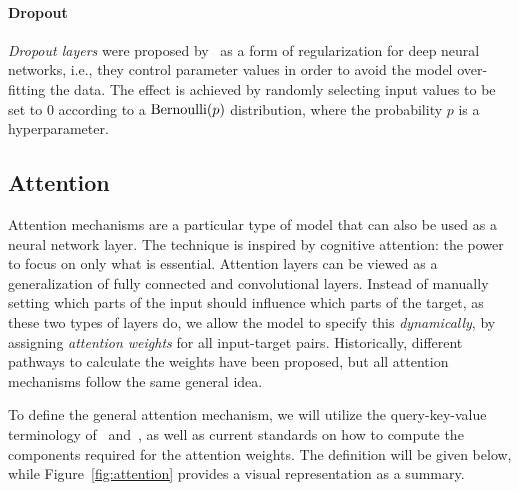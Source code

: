\paragraph{Dropout} \emph{Dropout layers} were proposed by~\cite{hinton_improving_2012} as a form of regularization for deep neural networks, i.e., they control parameter values in order to avoid the model over-fitting the data. The effect is achieved by randomly selecting input values to be set to $0$ according to a $\text{Bernoulli}\mathopen{}\left(p\right)$ distribution, where the probability $p$ is a hyperparameter.
 
\subsection{Attention}
Attention mechanisms are a particular type of model that can also be used as a neural network layer. The technique is inspired by cognitive attention: the power to focus on only what is essential. Attention layers can be viewed as a generalization of fully connected and convolutional layers. Instead of manually setting which parts of the input should influence which parts of the target, as these two types of layers do, we allow the model to specify this \emph{dynamically}, by assigning \emph{attention weights} for all input-target pairs. Historically, different pathways to calculate the weights have been proposed, but all attention mechanisms follow the same general idea.

To define the general attention mechanism, we will utilize the query-key-value terminology of~\cite{graves_neural_2014} and~\cite{vaswani_attention_2017}, as well as current standards on how to compute the components required for the attention weights. The definition will be given below, while Figure~\ref{fig:attention} provides a visual representation as a summary.

